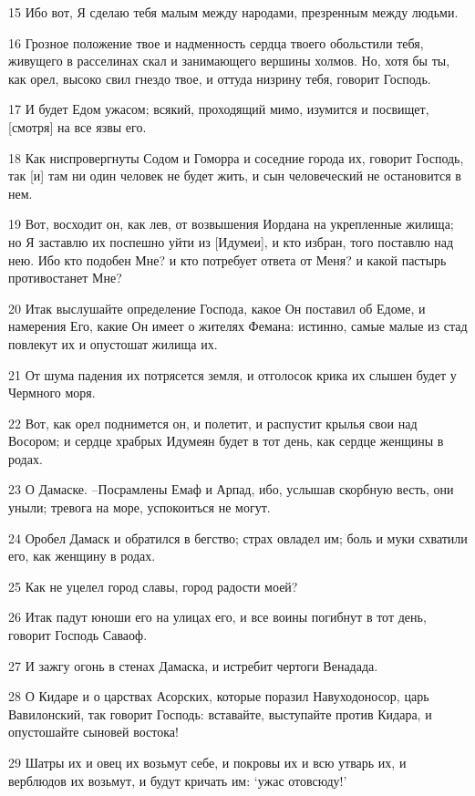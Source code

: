 \par 15 Ибо вот, Я сделаю тебя малым между народами, презренным между людьми.
\par 16 Грозное положение твое и надменность сердца твоего обольстили тебя, живущего в расселинах скал и занимающего вершины холмов. Но, хотя бы ты, как орел, высоко свил гнездо твое, и оттуда низрину тебя, говорит Господь.
\par 17 И будет Едом ужасом; всякий, проходящий мимо, изумится и посвищет, [смотря] на все язвы его.
\par 18 Как ниспровергнуты Содом и Гоморра и соседние города их, говорит Господь, так [и] там ни один человек не будет жить, и сын человеческий не остановится в нем.
\par 19 Вот, восходит он, как лев, от возвышения Иордана на укрепленные жилища; но Я заставлю их поспешно уйти из [Идумеи], и кто избран, того поставлю над нею. Ибо кто подобен Мне? и кто потребует ответа от Меня? и какой пастырь противостанет Мне?
\par 20 Итак выслушайте определение Господа, какое Он поставил об Едоме, и намерения Его, какие Он имеет о жителях Фемана: истинно, самые малые из стад повлекут их и опустошат жилища их.
\par 21 От шума падения их потрясется земля, и отголосок крика их слышен будет у Чермного моря.
\par 22 Вот, как орел поднимется он, и полетит, и распустит крылья свои над Восором; и сердце храбрых Идумеян будет в тот день, как сердце женщины в родах.
\par 23 О Дамаске. --Посрамлены Емаф и Арпад, ибо, услышав скорбную весть, они уныли; тревога на море, успокоиться не могут.
\par 24 Оробел Дамаск и обратился в бегство; страх овладел им; боль и муки схватили его, как женщину в родах.
\par 25 Как не уцелел город славы, город радости моей?
\par 26 Итак падут юноши его на улицах его, и все воины погибнут в тот день, говорит Господь Саваоф.
\par 27 И зажгу огонь в стенах Дамаска, и истребит чертоги Венадада.
\par 28 О Кидаре и о царствах Асорских, которые поразил Навуходоносор, царь Вавилонский, так говорит Господь: вставайте, выступайте против Кидара, и опустошайте сыновей востока!
\par 29 Шатры их и овец их возьмут себе, и покровы их и всю утварь их, и верблюдов их возьмут, и будут кричать им: `ужас отовсюду!'
